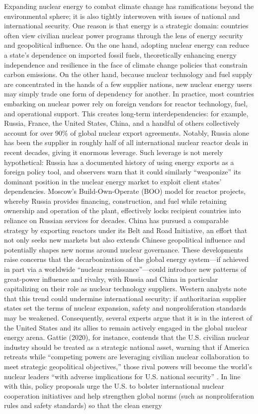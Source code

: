 \documentclass[11,5 pt]{article}
\begin{document}
Expanding nuclear energy to combat climate change has ramifications beyond the environmental sphere; it is also tightly interwoven with issues of national and international security. One reason is that energy is a strategic domain: countries often view civilian nuclear power programs through the lens of energy security and geopolitical influence. On the one hand, adopting nuclear energy can reduce a state's dependence on imported fossil fuels, theoretically enhancing energy independence and resilience in the face of climate change policies that constrain carbon emissions. On the other hand, because nuclear technology and fuel supply are concentrated in the hands of a few supplier nations, new nuclear energy users may simply trade one form of dependency for another. In practice, most countries embarking on nuclear power rely on foreign vendors for reactor technology, fuel, and operational support. This creates long-term interdependencies: for example, Russia, France, the United States, China, and a handful of others collectively account for over 90\% of global nuclear export agreements. Notably, Russia alone has been the supplier in roughly half of all international nuclear reactor deals in recent decades, giving it enormous leverage. Such leverage is not merely hypothetical: Russia has a documented history of using energy exports as a foreign policy tool, and observers warn that it could similarly “weaponize” its dominant position in the nuclear energy market to exploit client states’ dependencies. Moscow’s Build-Own-Operate (BOO) model for reactor projects, whereby Russia provides financing, construction, and fuel while retaining ownership and operation of the plant, effectively locks recipient countries into reliance on Russian services for decades. China has pursued a comparable strategy by exporting reactors under its Belt and Road Initiative, an effort that not only seeks new markets but also extends Chinese geopolitical influence and potentially shapes new norms around nuclear governance. These developments raise concerns that the decarbonization of the global energy system—if achieved in part via a worldwide “nuclear renaissance”—could introduce new patterns of great-power influence and rivalry, with Russia and China in particular capitalizing on their role as nuclear technology suppliers. Western analysts note that this trend could undermine international security: if authoritarian supplier states set the terms of nuclear expansion, safety and nonproliferation standards may be weakened. Consequently, several experts argue that it is in the interest of the United States and its allies to remain actively engaged in the global nuclear energy arena. Gattie (2020), for instance, contends that the U.S. civilian nuclear industry should be treated as a strategic national asset, warning that if America retreats while “competing powers are leveraging civilian nuclear collaboration to meet strategic geopolitical objectives,” those rival powers will become the world’s nuclear leaders “with adverse implications for U.S. national security” \cite{10.2307/26937414}. In line with this, policy proposals urge the U.S. to bolster international nuclear cooperation initiatives and help strengthen global norms (such as nonproliferation rules and safety standards) so that the clean energy 
\end{document}
